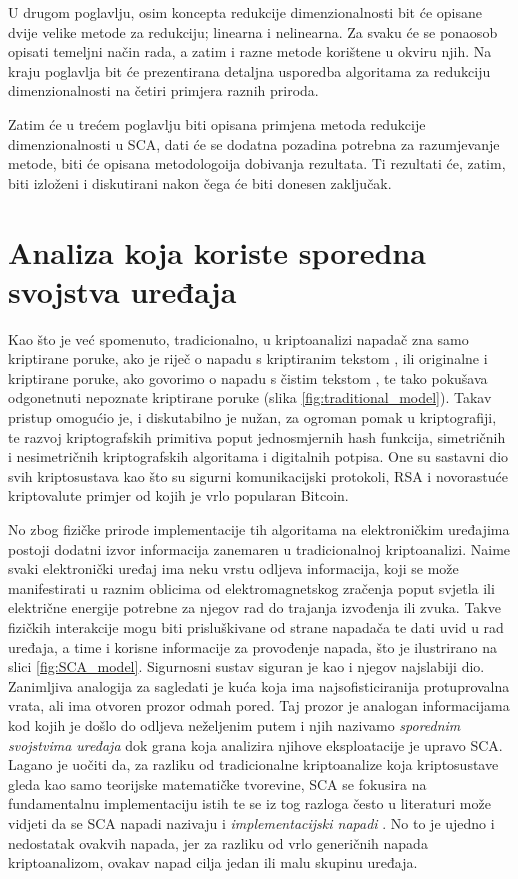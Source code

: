 \documentclass[times, utf8, diplomski]{fer}
\begin{document}
U drugom poglavlju, osim koncepta redukcije dimenzionalnosti bit će opisane dvije velike metode za redukciju; linearna i nelinearna. Za svaku će se ponaosob opisati temeljni način rada, a zatim i razne metode korištene u okviru njih. Na kraju poglavlja bit će prezentirana detaljna usporedba algoritama za redukciju dimenzionalnosti na četiri primjera raznih priroda.

Zatim će u trećem poglavlju biti opisana primjena metoda redukcije dimenzionalnosti u SCA, dati će se dodatna pozadina potrebna za razumjevanje metode, biti će opisana metodologoija dobivanja rezultata. Ti rezultati će, zatim, biti izloženi i diskutirani nakon čega će biti donesen zaključak.




\chapter{Analiza koja koriste sporedna svojstva uređaja}

Kao što je već spomenuto, tradicionalno, u kriptoanalizi napadač  zna samo kriptirane poruke, ako je riječ o napadu s kriptiranim tekstom , ili originalne i kriptirane poruke, ako govorimo o napadu s čistim tekstom , te tako pokušava odgonetnuti nepoznate kriptirane poruke (slika \ref{fig:traditional_model}). Takav pristup omogućio je, i diskutabilno je nužan, za ogroman pomak u kriptografiji, te razvoj kriptografskih primitiva poput jednosmjernih hash funkcija, simetričnih i nesimetričnih kriptografskih algoritama i digitalnih potpisa. One su sastavni dio svih kriptosustava kao što su sigurni komunikacijski protokoli, RSA i novorastuće kriptovalute primjer od kojih je vrlo popularan Bitcoin.

No zbog fizičke prirode implementacije tih algoritama na elektroničkim uređajima postoji dodatni izvor informacija zanemaren u tradicionalnoj kriptoanalizi. Naime svaki elektronički uređaj ima neku vrstu odljeva informacija, koji se može manifestirati u raznim oblicima od elektromagnetskog zračenja poput svjetla ili električne energije potrebne za njegov rad do trajanja izvođenja ili zvuka. Takve fizičkih interakcije mogu biti prisluškivane od strane napadača te dati uvid u rad uređaja, a time i korisne informacije za provođenje napada, što je ilustrirano na slici \ref{fig:SCA_model}. Sigurnosni sustav siguran je kao i njegov najslabiji dio. Zanimljiva analogija za sagledati je kuća koja ima najsofisticiranija protuprovalna vrata, ali ima otvoren prozor odmah pored. Taj prozor je analogan informacijama kod kojih je došlo do odljeva neželjenim putem i njih nazivamo \emph{sporednim svojstvima uređaja}  dok grana koja analizira njihove eksploatacije je upravo SCA. Lagano je uočiti da, za razliku od tradicionalne kriptoanalize koja kriptosustave gleda kao samo teorijske matematičke tvorevine, SCA se fokusira na fundamentalnu implementaciju istih te se iz tog razloga često u literaturi može vidjeti da se SCA napadi nazivaju i \emph{implementacijski napadi} . No to je ujedno i nedostatak ovakvih napada, jer za razliku od vrlo generičnih napada kriptoanalizom, ovakav napad cilja jedan ili malu skupinu uređaja.
\end{document}
